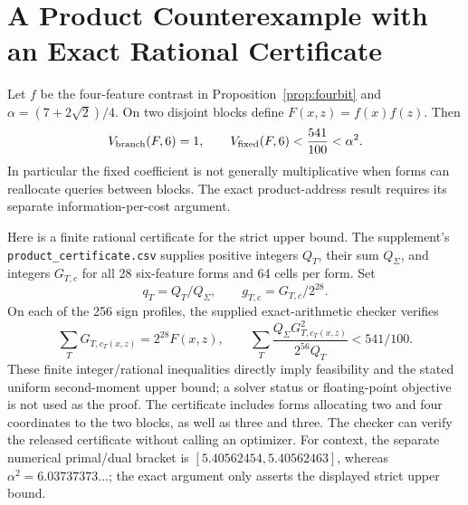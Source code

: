 \section{A Product Counterexample with an Exact Rational Certificate}
\label{app:nonmultiplicative}
Let $f$ be the four-feature contrast in Proposition~\ref{prop:fourbit} and
$\alpha=(7+2\sqrt2)/4$. On two disjoint blocks define $F(x,z)=f(x)f(z)$.
Then
\[
 V_{\rm branch}(F,6)=1,\qquad
 V_{\rm fixed}(F,6)<\frac{541}{100}<\alpha^2.
\]
In particular the fixed coefficient is not generally multiplicative when
forms can reallocate queries between blocks. The exact product-address
result requires its separate information-per-cost argument.

Here is a finite rational certificate for the strict upper bound. The
supplement's \texttt{product\_certificate.csv} supplies positive integers
$Q_T$, their sum $Q_\Sigma$, and integers $G_{T,c}$ for all 28 six-feature
forms and 64 cells per form. Set
\[
 q_T=Q_T/Q_\Sigma,\qquad g_{T,c}=G_{T,c}/2^{28}.
\]
On each of the 256 sign profiles, the supplied exact-arithmetic checker
verifies
\[
 \sum_TG_{T,c_T(x,z)}=2^{28}F(x,z),\qquad
 \sum_T\frac{Q_\Sigma G_{T,c_T(x,z)}^2}{2^{56}Q_T}<541/100.
\]
These finite integer/rational inequalities directly imply feasibility
and the stated uniform second-moment upper bound; a solver status or
floating-point objective is not used as the proof. The certificate includes
forms allocating two and four coordinates to the two blocks, as well as
three and three. The checker can verify the released certificate without
calling an optimizer. For context, the separate numerical primal/dual
bracket is $[5.40562454,5.40562463]$, whereas $\alpha^2=6.03737373\ldots$;
the exact argument only asserts the displayed strict upper bound.
